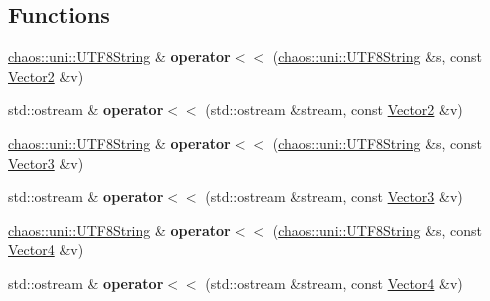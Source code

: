 \subsection*{Functions}
\begin{DoxyCompactItemize}
\item 
\hypertarget{namespacechaos_1_1gfx_a1de33c2369485b21d55cb0b17551c175}{\hyperlink{classchaos_1_1uni_1_1_u_t_f8_string}{chaos\-::uni\-::\-U\-T\-F8\-String} \& {\bfseries operator$<$$<$} (\hyperlink{classchaos_1_1uni_1_1_u_t_f8_string}{chaos\-::uni\-::\-U\-T\-F8\-String} \&s, const \hyperlink{classchaos_1_1gfx_1_1_vector2}{Vector2} \&v)}\label{namespacechaos_1_1gfx_a1de33c2369485b21d55cb0b17551c175}

\item 
\hypertarget{namespacechaos_1_1gfx_ab0c024010ee012b4c4083a5457f44fe9}{std\-::ostream \& {\bfseries operator$<$$<$} (std\-::ostream \&stream, const \hyperlink{classchaos_1_1gfx_1_1_vector2}{Vector2} \&v)}\label{namespacechaos_1_1gfx_ab0c024010ee012b4c4083a5457f44fe9}

\item 
\hypertarget{namespacechaos_1_1gfx_a5479948e624623b581c0285c150eb53d}{\hyperlink{classchaos_1_1uni_1_1_u_t_f8_string}{chaos\-::uni\-::\-U\-T\-F8\-String} \& {\bfseries operator$<$$<$} (\hyperlink{classchaos_1_1uni_1_1_u_t_f8_string}{chaos\-::uni\-::\-U\-T\-F8\-String} \&s, const \hyperlink{classchaos_1_1gfx_1_1_vector3}{Vector3} \&v)}\label{namespacechaos_1_1gfx_a5479948e624623b581c0285c150eb53d}

\item 
\hypertarget{namespacechaos_1_1gfx_a05bd520f9a9d1749435f253c2ef3eeb0}{std\-::ostream \& {\bfseries operator$<$$<$} (std\-::ostream \&stream, const \hyperlink{classchaos_1_1gfx_1_1_vector3}{Vector3} \&v)}\label{namespacechaos_1_1gfx_a05bd520f9a9d1749435f253c2ef3eeb0}

\item 
\hypertarget{namespacechaos_1_1gfx_a64b66c65748de4785cef34e1a2726808}{\hyperlink{classchaos_1_1uni_1_1_u_t_f8_string}{chaos\-::uni\-::\-U\-T\-F8\-String} \& {\bfseries operator$<$$<$} (\hyperlink{classchaos_1_1uni_1_1_u_t_f8_string}{chaos\-::uni\-::\-U\-T\-F8\-String} \&s, const \hyperlink{classchaos_1_1gfx_1_1_vector4}{Vector4} \&v)}\label{namespacechaos_1_1gfx_a64b66c65748de4785cef34e1a2726808}

\item 
\hypertarget{namespacechaos_1_1gfx_a573c92de32be52fd7444d574e5dd361f}{std\-::ostream \& {\bfseries operator$<$$<$} (std\-::ostream \&stream, const \hyperlink{classchaos_1_1gfx_1_1_vector4}{Vector4} \&v)}\label{namespacechaos_1_1gfx_a573c92de32be52fd7444d574e5dd361f}


\end{DoxyCompactItemize}
